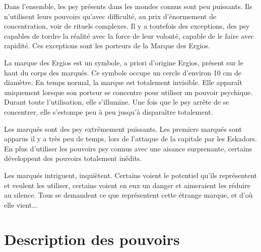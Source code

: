 \begin{multicols}{2}

Dans l'ensemble, les psy présents dans les mondes connus sont peu puissants. Ils n'utilisent leurs pouvoirs qu'avec difficulté, au prix d'énormement de concentration, voir de rituels complexes. Il y a toutefois des exceptions, des psy capables de tordre la réalité avec la force de leur volonté, capable de le faire avec rapidité. Ces exceptions sont les porteurs de la Marque des Ergios.

La marque des Ergios est un symbole, a priori d'origine Ergios, présent sur le haut du corps des marqués. Ce symbole occupe un cercle d'environ 10 cm de diamètre. En temps normal, la marque est totalement invisible. Elle apparaît uniquement lorsque son porteur se concentre pour utiliser un pouvoir psychique. Durant toute l'utilisation, elle s'illumine. Une fois que le psy arrête de se concentrer, elle s'estompe peu à peu jusqu'à disparaître totalement.

Les marqués sont des psy extrêmement puissants. Les premiers marqués sont apparus il y a très peu de temps, lors de l'attaque de la capitale par les Eskadors. En plus d'utiliser les pouvoirs psy connus avec une aisance surprenante, certains développent des pouvoirs totalement inédits.

Les marqués intriguent, inquiètent. Certains voient le potentiel qu'ils représentent et veulent les utiliser, certains voient en eux un danger et aimeraient les réduire au silence. Tous se demandent ce que représentent cette étrange marque, et d'où elle vient...

\end{multicols}


\chapter{Description des pouvoirs}

